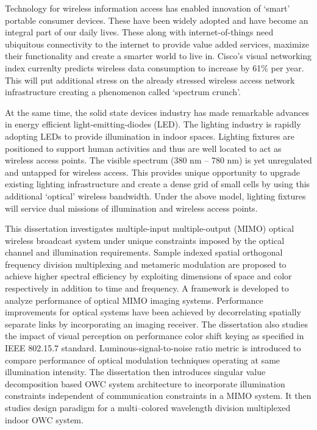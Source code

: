 
Technology for wireless information access has enabled innovation of
`smart' portable consumer devices. These have been widely adopted and
have become an integral part of our daily lives. These along with
internet-of-things need ubiquitous connectivity to the internet to
provide value added services, maximize their functionality and create
a smarter world to live in. Cisco's visual networking index currenlty
predicts wireless data consumption to increase by 61\% per year. This
will put additional stress on the already stressed wireless access
network infrastructure creating a phenomenon called `spectrum crunch'.

At the same time, the solid state devices industry has made remarkable
advances in energy efficient light-emitting-diodes (LED). The lighting
industry is rapidly adopting LEDs to provide illumination in indoor
spaces. Lighting fixtures are positioned to support human activities
and thus are well located to act as wireless access points. The
visible spectrum (380 nm -- 780 nm) is yet unregulated and untapped
for wireless access. This provides unique opportunity to upgrade
existing lighting infrastructure and create a dense grid of small
cells by using this additional `optical' wireless bandwidth. Under the
above model, lighting fixtures will service dual missions of
illumination and wireless access points.

This dissertation investigates multiple-input multiple-output (MIMO)
optical wireless broadcast system under unique constraints imposed by
the optical channel and illumination requirements. Sample indexed
spatial orthogonal frequency division multiplexing and metameric
modulation are proposed to achieve higher spectral efficiency by
exploiting dimensions of space and color respectively in addition to
time and frequency. A framework is developed to analyze performance of
optical MIMO imaging systems. Performance improvements for optical
systems have been achieved by decorrelating spatially separate links
by incorporating an imaging receiver. The dissertation also studies
the impact of visual perception on performance color shift keying as
specified in IEEE 802.15.7 standard. Luminous-signal-to-noise ratio
metric is introduced to compare performance of optical modulation
techniques operating at same illumination intensity. The dissertation
then introduces singular value decomposition based OWC system
architecture to incorporate illumination constraints independent of
communication constraints in a MIMO system. It then studies design
paradigm for a multi--colored wavelength division multiplexed indoor
OWC system.
